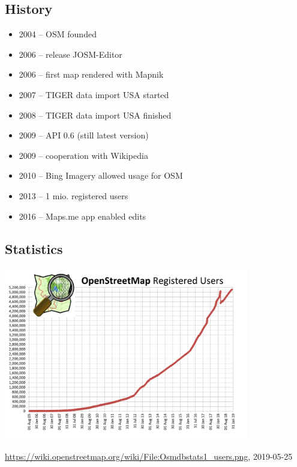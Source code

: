 \documentclass{beamer}
\begin{document}
	\subsection{History}

	\begin{frame}
		\begin{itemize}
			\item 2004 -- OSM founded
			\item 2006 -- release JOSM-Editor
			\item 2006 -- first map rendered with Mapnik
			\item 2007 -- TIGER data import USA started
			\item 2008 -- TIGER data import USA finished
			\item 2009 -- API 0.6 (still latest version)
			\item 2009 -- cooperation with Wikipedia
			\item 2010 -- Bing Imagery allowed usage for OSM
			\item 2013 -- 1 mio. registered users
			\item 2016 -- Maps.me app enabled edits
		\end{itemize}
	\end{frame}

	\subsection{Statistics}

	\begin{frame}
		\begin{center}
			\includegraphics[width=0.8\textwidth,height=0.8\textheight,keepaspectratio]{images/Osmdbstats1_users.png}
		\end{center}
		{\tiny \url{https://wiki.openstreetmap.org/wiki/File:Osmdbstats1_users.png}, 2019-05-25}
	\end{frame}
\end{document}
